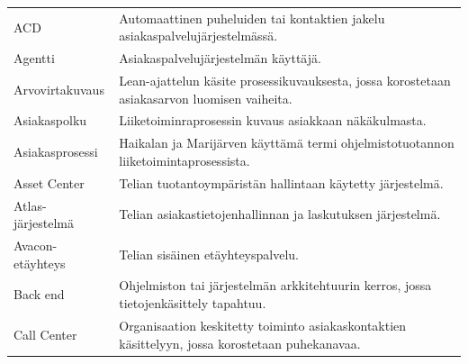 \documentclass[finnish,12pt,a4paper,pdftex]{article}
\begin{document}
\begin{table}[h!]
\centering
\label{my-label}

\begin{tabular}{ p{5cm}  p{\textwidth-6cm} }
ACD                         & Automaattinen puheluiden tai kontaktien jakelu asiakaspalvelujärjestelmässä.                                                                      \\ [0.9em]
Agentti                     & Asiakaspalvelujärjestelmän käyttäjä.                                                                                                              \\[0.9em]
Arvovirtakuvaus             & Lean-ajattelun käsite prosessikuvauksesta, jossa korostetaan asiakasarvon luomisen vaiheita.                                                     \\[0.9em]
Asiakaspolku                & Liiketoiminraprosessin kuvaus asiakkaan näkäkulmasta.                                                                                            \\[0.9em]
Asiakasprosessi             & Haikalan ja Marijärven \citeyearpar{ohjelmistotuotanto} käyttämä termi ohjelmistotuotannon liiketoimintaprosessista.                                                       \\[0.9em]
Asset Center                & Telian tuotantoympäristän hallintaan käytetty järjestelmä.                                                                                       \\[0.9em]
Atlas-järjestelmä           & Telian asiakastietojenhallinnan ja laskutuksen järjestelmä.                                                                                                                                             \\[0.9em]
Avacon-etäyhteys            & Telian sisäinen etäyhteyspalvelu.                                                                                                                                                 \\[0.9em]
Back end                    & Ohjelmiston tai järjestelmän arkkitehtuurin kerros, jossa tietojenkäsittely tapahtuu.                                                            \\[0.9em]
Call Center                 & Organisaation keskitetty toiminto asiakaskontaktien käsittelyyn, jossa korostetaan puhekanavaa.                                                  \\[0.9em]

\end{tabular}
\end{table}
\end{document}

